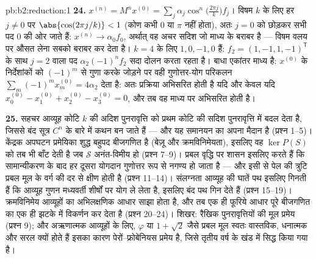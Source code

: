 \begin{solution}{pb:b2:reduction:1}
\textbf{24.} $x^{(n)} = M^nx^{(0)} = \sum_j
\alpha_j\cos^n\bigl(\tfrac{2\pi j}k\bigr)f_j$। विषम $k$ के लिए हर $j \neq 0$ पर $\abs{\cos(2\pi j/k)} < 1$ (कोण कभी $0$ या $\pi$
नहीं होता), अतः $j = 0$ को छोड़कर सभी पद $0$ की ओर जाते हैं: $x^{(n)} \to \alpha_0 f_0$, अर्थात्
वह अचर सदिश जो माध्य के बराबर है --- विषम वलय पर औसत लेना सबको बराबर
कर देता है। $k = 4$ के लिए  $1, 0, -1, 0$ हैं: $f_2 = (1, -1, 1, -1)^{\mathsf T}$ के साथ $j = 2$ वाला
पद $\alpha_2(-1)^nf_2$ सदा दोलन करता रहता है। बाधा एकांतर माध्य है: $x^{(0)}$ के
निर्देशांकों को $(-1)^m$ से गुणा करके जोड़ने पर वही गुणोत्तर-योग परिकलन
$\sum_m
(-1)^mx^{(0)}_m = 4\alpha_2$ देता है: अतः प्रक्रिया अभिसरित होती है यदि और केवल यदि $x^{(0)}_0 - x^{(0)}_1 + x^{(0)}_2 - x^{(0)}_3 = 0$, और
तब वह माध्य पर अभिसरित होती है।

\textbf{25.} सहचर आव्यूह कोटि $k$ की अदिश पुनरावृत्ति को प्रथम कोटि की
सदिश पुनरावृत्ति में बदल देता है, जिससे बंद सूत्र $C^n$ के बारे में कथन
बन जाते हैं --- और यह समानयन का अपना मैदान है (प्रश्न 1--5)। केंद्रक
अपघटन प्रमेयिका शुद्ध बहुपद बीजगणित है (बेज़ू और क्रमविनिमेयता), इसलिए
वह $\ker P(S)$ को तब भी बाँट देती है जब $\mathcal{S}$ अनंत-विमीय हो (प्रश्न 7--9)। प्रबल
 वृद्धि पर शासन इसलिए करते हैं कि सामान्यीकरण के बाद हर
दूसरा योगदान गुणोत्तर रूप से नगण्य हो जाता है --- और इसी से पेल की
त्रुटि प्रबल मूल के वर्ग की दर से क्षीण होती है (प्रश्न 11--14)।
संलग्नता आव्यूह की घातें पथ इसलिए गिनती हैं कि आव्यूह गुणन मध्यवर्ती
शीर्षों पर योग ले लेता है, इसलिए  बंद पथ गिन देते हैं (प्रश्न
15--19)। क्रमविनिमेय आव्यूहों का अभिलक्षणिक आधार साझा होता है, और तब एक
ही फूरिये आधार पूरे  बीजगणित का एक ही झटके में विकर्णन कर देता है
(प्रश्न 20--24)। शिखर: रैखिक पुनरावृत्तियों की मूल प्रमेय (प्रश्न 9);
और अऋणात्मक आव्यूहों के लिए, $\varphi$ या $1 +
\sqrt2$ जैसे प्रबल मूल स्वतः वास्तविक,
धनात्मक और सरल क्यों होते हैं इसका कारण पेरों--फ्रोबेनियस प्रमेय है,
जिसे तृतीय वर्ष के खंड में सिद्ध किया गया है।
\end{solution}
